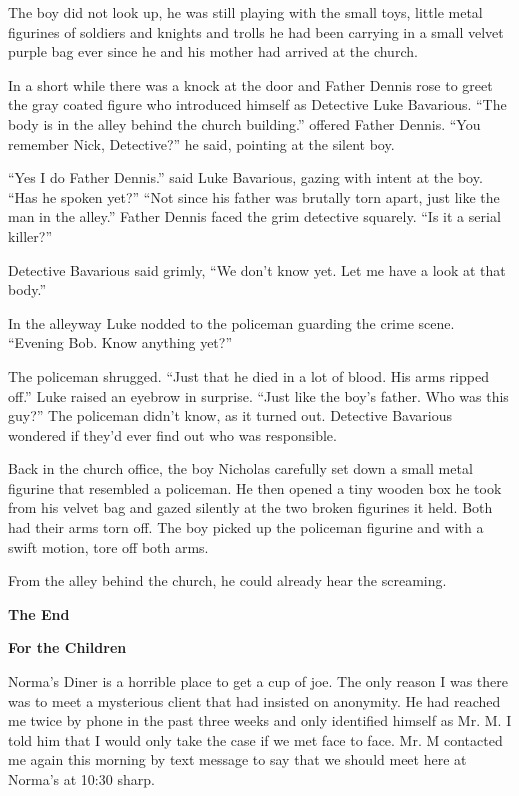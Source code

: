 The boy did not look up, he was still playing with the small toys,
little metal figurines of soldiers and knights and trolls he had
been carrying in a small velvet purple bag ever since he and his
mother had arrived at the church.

In a short while there was a knock at the door and Father Dennis
rose to greet the gray coated figure who introduced himself as
Detective Luke Bavarious. ``The body is in the alley behind the
church building.'' offered Father Dennis. ``You remember Nick,
Detective?'' he said, pointing at the silent boy.

``Yes I do Father Dennis.'' said Luke Bavarious, gazing with intent
at the boy. ``Has he spoken yet?'' ``Not since his father was brutally
torn apart, just like the man in the alley.'' Father Dennis faced
the grim detective squarely. ``Is it a serial killer?''

Detective Bavarious said grimly, ``We don't know yet. Let me have a
look at that body.''

In the alleyway Luke nodded to the policeman guarding the crime
scene. ``Evening Bob. Know anything yet?''

The policeman shrugged. ``Just that he died in a lot of blood. His
arms ripped off.'' Luke raised an eyebrow in surprise. ``Just like
the boy's father. Who was this guy?'' The policeman didn't know, as
it turned out. Detective Bavarious wondered if they'd ever find out
who was responsible.

Back in the church office, the boy Nicholas carefully set down a
small metal figurine that resembled a policeman. He then opened a
tiny wooden box he took from his velvet bag and gazed silently at
the two broken figurines it held. Both had their arms torn off. The
boy picked up the policeman figurine and with a swift motion, tore
off both arms.

From the alley behind the church, he could already hear the
screaming.



{\bf The End} 
 





{\bf For the Children}



Norma's Diner is a horrible place to get a cup of joe. The only
reason I was there was to meet a mysterious client that had
insisted on anonymity. He had reached me twice by phone in the past
three weeks and only identified himself as Mr. M. I told him that I
would only take the case if we met face to face. Mr. M contacted me
again this morning by text message to say that we should meet here
at Norma's at 10:30 sharp.



